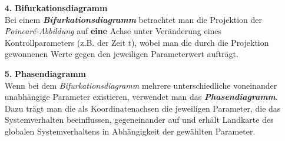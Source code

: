 \begin{itemize}
    \item[\textbf{4.}]{\textbf{Bifurkationsdiagramm}}\\
    Bei einem \textit{\textbf{Bifurkationsdiagramm}} betrachtet man die Projektion der \textit{Poincar\'e-Abbildung} auf \textbf{eine} Achse unter Veränderung eines Kontrollparameters (z.B. der Zeit $t$), wobei man die durch die Projektion gewonnenen Werte gegen den jeweiligen Parameterwert aufträgt. \citep{Lueck}
    \item[\textbf{5.}]{\textbf{Phasendiagramm}}\\
    Wenn bei dem \textit{Bifurkationsdiagramm} mehrere unterschiedliche voneinander unabhängige Parameter existieren, verwendet man das \textit{\textbf{Phasendiagramm}}. Dazu trägt man die als Koordinatenachsen die jeweiligen Parameter, die das Systemverhalten beeinflussen, gegeneinander auf und erhält Landkarte des globalen Systemverhaltens in Abhängigkeit der gewählten Parameter. \citep{Lueck}    
\end{itemize}